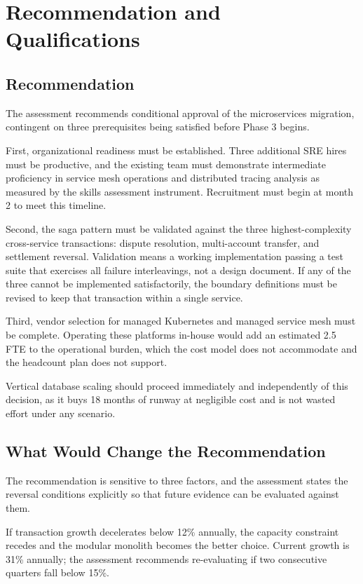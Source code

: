 \section{Recommendation and Qualifications}

\subsection{Recommendation}

The assessment recommends conditional approval of the microservices migration, contingent on three prerequisites being satisfied before Phase 3 begins.

First, organizational readiness must be established. Three additional SRE hires must be productive, and the existing team must demonstrate intermediate proficiency in service mesh operations and distributed tracing analysis as measured by the skills assessment instrument. Recruitment must begin at month 2 to meet this timeline.

Second, the saga pattern must be validated against the three highest-complexity cross-service transactions: dispute resolution, multi-account transfer, and settlement reversal. Validation means a working implementation passing a test suite that exercises all failure interleavings, not a design document. If any of the three cannot be implemented satisfactorily, the boundary definitions must be revised to keep that transaction within a single service.

Third, vendor selection for managed Kubernetes and managed service mesh must be complete. Operating these platforms in-house would add an estimated 2.5 FTE to the operational burden, which the cost model does not accommodate and the headcount plan does not support.

Vertical database scaling should proceed immediately and independently of this decision, as it buys 18 months of runway at negligible cost and is not wasted effort under any scenario.

\subsection{What Would Change the Recommendation}

The recommendation is sensitive to three factors, and the assessment states the reversal conditions explicitly so that future evidence can be evaluated against them.

If transaction growth decelerates below 12\% annually, the capacity constraint recedes and the modular monolith becomes the better choice. Current growth is 31\% annually; the assessment recommends re-evaluating if two consecutive quarters fall below 15\%.

